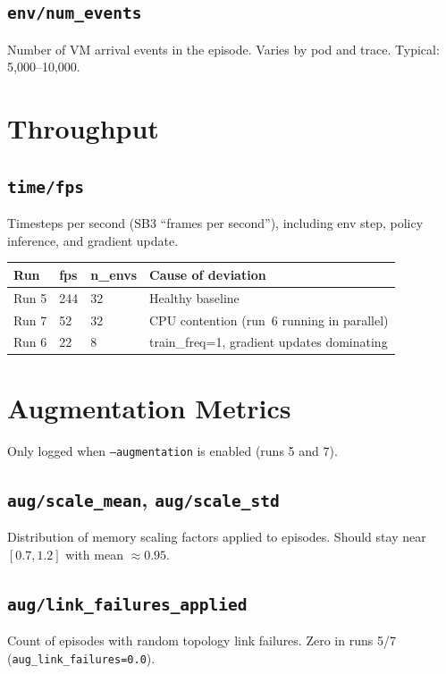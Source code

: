 \documentclass[11pt]{article}
\begin{document}
\subsection*{\texttt{env/num\_events}}
Number of VM arrival events in the episode.  Varies by pod and trace.
Typical: 5{,}000--10{,}000.

\section{Throughput}

\subsection*{\texttt{time/fps}}
Timesteps per second (SB3 ``frames per second''), including env step, policy
inference, and gradient update.

\begin{center}
\begin{tabular}{llll}
\toprule
Run & fps & n\_envs & Cause of deviation \\
\midrule
Run 5 & 244 & 32 & Healthy baseline \\
Run 7 & 52  & 32 & CPU contention (run~6 running in parallel) \\
Run 6 & 22  & 8  & train\_freq=1, gradient updates dominating \\
\bottomrule
\end{tabular}
\end{center}

\section{Augmentation Metrics}
Only logged when \texttt{--augmentation} is enabled (runs 5 and 7).

\subsection*{\texttt{aug/scale\_mean}, \texttt{aug/scale\_std}}
Distribution of memory scaling factors applied to episodes.  Should stay
near $[0.7, 1.2]$ with mean $\approx 0.95$.

\subsection*{\texttt{aug/link\_failures\_applied}}
Count of episodes with random topology link failures.  Zero in runs 5/7
(\texttt{aug\_link\_failures=0.0}).
\end{document}
